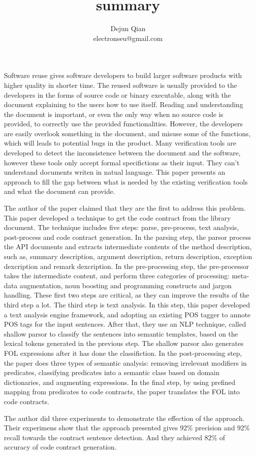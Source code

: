 \documentclass[11pt,letterpaper,oneside]{article}
\title{summary}
\author{Dejun Qian\\electronseu@gmail.com}
\date{}
\begin{document}
\maketitle

Software reuse gives software developers to build larger software products with higher quality in shorter time.
The reused software is usually provided to the developers in the forms of source code or binary executable,
along with the document explaining to the users how to use itself.
Reading and understanding the document is important, 
or even the only way when no source code is provided,
to correctly use the provided functionalities.
However, the developers are easily overlook something in the document,
and misuse some of the functions,
which will leads to potential bugs in the product.
Many verification tools are developed to detect the inconsistence between the document and the software,
however these tools only accept formal specifictions as their input.
They can't understand documents writen in natual language.
This paper \cite{bib:Pandita} presents an approach to fill the gap between what is needed by the existing verification tools and what the document can provide.

The author of the paper claimed that they are the first to address this problem.
This paper developed a technique to get the code contract from the library document.
The technique includes five steps: parse, pre-process, text analysis, post-process and code contract generation.
In the parsing step, the parsor process the API documents and extracts intermediate contents of the method description, 
such as, summary description, argument description, return description, exception dexcription and remark dexcription. 
In the pre-processing step, the pre-processor takes the intermediate content, 
and perform three categories of processing: meta-data augmentation, noun boosting and programming constructs and jargon handling.
These first two steps are critical, as they can improve the results of the third step a lot.
The third step is text analysis.
In this step, this paper developed a text analysis engine framework, 
and adopting an existing POS tagger to annote POS tags for the input sentences.
After that, they use an NLP technique, called shallow parsor to classify the sentences into semantic templates,
based on the lexical tokens generated in the previous step.
The shallow parsor also generates FOL expressions after it has done the classifiction.
In the post-processing step, the paper does three types of semantic analysis: removing irrelevant modifiers in predicates, classifying predicates into a semantic class based on domain dictionaries, and augmenting expressions.
In the final step, by using prefined mapping from predicates to code contracts,
the paper translates the FOL into code contracts.

The author did three experiments to demonstrate the effection of the approach. 
Their experimens show that the approach presented gives 92\% precision and 92\% recall towards the contract sentence detection.
And they achieved 82\% of accuracy of code contract generation.



\end{document}
